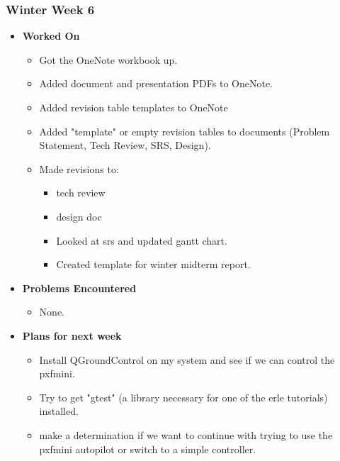 \documentclass[compsoc,draftclsnofoot,onecolumn,10pt]{IEEEtran}
\begin{document}
\subsubsection{Winter Week 6}
\begin{itemize}
    \item {\textbf{Worked On}}
    \begin{itemize}
        \item Got the OneNote workbook up.
        \item Added document and presentation PDFs to OneNote.
        \item Added revision table templates to OneNote
        \item Added "template" or empty revision tables to documents (Problem Statement, Tech Review, SRS, Design).
        \item Made revisions to:
        \begin{itemize}
            \item tech review
            \item design doc
            \item Looked at srs and updated gantt chart.
            \item Created template for winter midterm report.
        \end{itemize}
    \end{itemize}

    \item {\textbf{Problems Encountered}}
    \begin{itemize}
        \item None.
    \end{itemize}

    \item{\textbf{Plans for next week}}
    \begin{itemize}
        \item Install QGroundControl on my system and see if we can control the pxfmini.
        \item Try to get "gtest" (a library necessary for one of the erle tutorials) installed.
        \item make a determination if we want to continue with trying to use the pxfmini autopilot or switch to a simple controller.
    \end{itemize}
\end{itemize}
\end{document}
